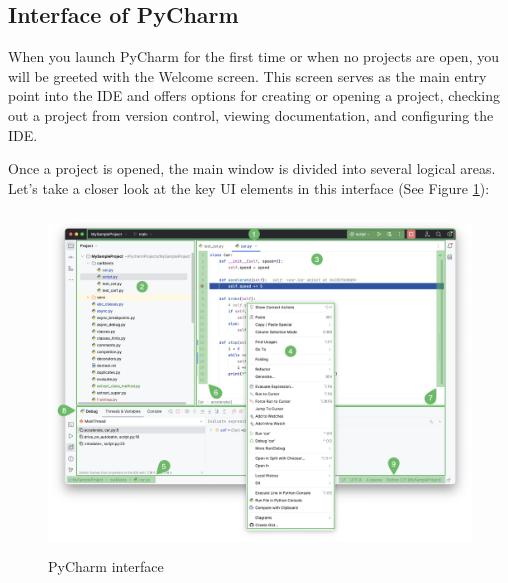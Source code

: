 \subsection{Interface of PyCharm}

When you launch PyCharm for the first time or when no projects are open, you will be greeted with the Welcome screen. This screen serves as the main entry point into the IDE and offers options for creating or opening a project, checking out a project from version control, viewing documentation, and configuring the IDE.

Once a project is opened, the main window is divided into several logical areas. Let's take a closer look at the key UI elements in this interface (See Figure \ref{PyCharm_interface}):



\begin{center}
	\begin{figure}[h!]
		\begin{center}
			\includegraphics[height=90mm, width=130mm]{Images/pyMainWindowOverview.png}
		\end{center}
		\caption{PyCharm interface \cite{JetBrains:2023}}\label{PyCharm_interface}
	\end{figure}
\end{center}


